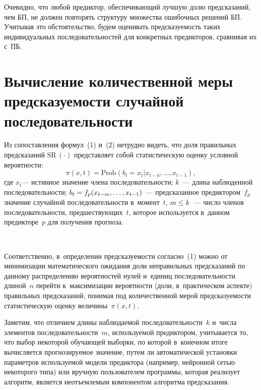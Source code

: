 \begin{multicols}{2}
  Очевидно, что любой предиктор, обеспечивающий лучшую долю 
предсказаний, чем БП, не должен повторять структуру множества 
ошибочных решений БП. Учитывая это обстоятельство, будем оценивать 
предсказуемость таких индивидуальных последовательностей для 
конкретных предикторов, сравнивая их с~ПБ.

\section{Вычисление количественной меры предсказуемости 
случайной последовательности}

  Из сопоставления формул~(1) и~(2) нетрудно видеть, что доля правильных 
предсказаний $\mathrm{SR}\,(\cdot)$ представляет собой статистическую 
оценку условной вероятности: 
  $$
  \pi (x, t) = \mathrm{Prob}\left ( b_t = x_t \vert x_{t-k}, \ldots , x_{t-1}\right),
  $$ 
где $x_t$--- истинное значение члена по\-сле\-до\-ва\-тель\-ности; $k$~--- длина 
наблюденной по\-сле\-до\-ва\-тель\-ности; $b_t \hm= f_p(x_{t-m}, \ldots , x_{t-1})$~--- 
предсказанное предиктором~$f_p$ значение случайной последовательности 
в~момент~$t$,  
$m\hm \leq k$~--- чис\-ло членов последовательности, предшествующих~$t$, 
которое используется в~данном предикторе~$p$ для получения прогноза. 

 \begin{figure*}[b] %
  \vspace*{1pt}
 \begin{center}
 \mbox{%
 \epsfxsize=144.644mm 
 }
 \end{center}
   \vspace*{-9pt}
  \end{figure*}
  

  Соответственно, в~определении пред\-ска\-зу\-емости согласно~(1) можно от 
минимизации математического ожидания доли неправильных предсказаний 
по данному распределению вероятностей нулей и~единиц 
последовательности длиной~$n$ перейти к~максимизации вероятности 
(доли, в~практическом аспекте) правильных предсказаний, понимая под 
количественной мерой предсказуемости статистическую оценку 
величины~$\pi(x,t)$.
   
  Заметим, что отличием длины наблюдаемой последовательности~$k$ 
и~числа элементов последовательности~$m$, используемой предиктором, 
учитывается то, что выбор некоторой обучающей выборки, по которой 
в~конечном итоге вычисляется прогнозируемое значение, путем ли 
автоматической установки параметров используемой модели предиктора 
(например, нейронной сетью некоторого типа) или вручную пользователем 
программы, которая реализует алгоритм, является неотъемлемым 
компонентом алгоритма предсказания. 


\end{multicols}
